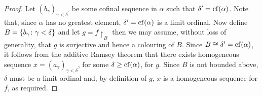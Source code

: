 \begin{proof}
	Let $(b_\gamma)_{\gamma<\delta^\prime}$ be some cofinal sequence in $\alpha$ such that $\delta^\prime=\operatorname{cf}(\alpha)$.  Note that, since $\alpha$ has no greatest element, $\delta^\prime=\operatorname{cf}(\alpha)$ is a limit ordinal.  Now define $B=\left\lbrace b_\gamma\colon \gamma<\delta \right\rbrace$ and let $g=f\restriction_B$ then we may assume, without loss of generality, that $g$ is surjective and hence a colouring of $B$.  Since $B\cong\delta^\prime=\operatorname{cf}(\alpha)$, it follows from the additive Ramsey theorem that there exists homogeneous sequence $x=(a_\gamma)_{\gamma<\delta}$, for some $\delta\geq\operatorname{cf}(\alpha)$, for $g$.  Since $B$ is not bounded above, $\delta$ must be a limit ordinal and, by definition of $g$, $x$ is a homogeneous sequence for $f$, as required.
\end{proof}



